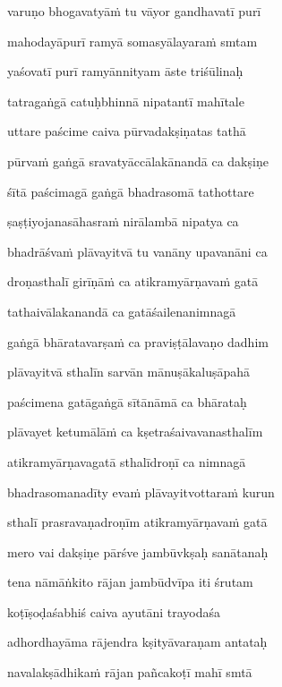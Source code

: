 varuṇo bhogavatyā\.m tu vāyor gandhavatī purī\thinspace{\dandab} \dontdisplaylinenum

mahodayāpurī ramyā somasyālayara\.m smtam \veg\dontdisplaylinenum

yaśovatī purī ramyānnityam āste triśūlinaḥ\thinspace{\dandab} \dontdisplaylinenum

tatragaṅgā catuḥbhinnā nipatantī mahītale \veg\dontdisplaylinenum

uttare paścime caiva pūrvadakṣiṇatas tathā\thinspace{\dandab} \dontdisplaylinenum

pūrva\.m gaṅgā sravatyāccālakānandā ca dakṣiṇe \veg\dontdisplaylinenum

śītā paścimagā gaṅgā bhadrasomā tathottare\thinspace{\dandab} \dontdisplaylinenum

ṣaṣṭiyojanasāhasra\.m nirālambā nipatya ca \veg\dontdisplaylinenum

bhadrāśva\.m plāvayitvā tu vanāny upavanāni ca\thinspace{\dandab} \dontdisplaylinenum

droṇasthalī girīṇā\.m ca atikramyārṇava\.m gatā \veg\dontdisplaylinenum

tathaivālakanandā ca gatāśailenanimnagā\thinspace{\dandab} \dontdisplaylinenum

gaṅgā bhāratavarṣa\.m ca praviṣṭālavaṇo dadhim \veg\dontdisplaylinenum

plāvayitvā sthalīn sarvān mānuṣākaluṣāpahā\thinspace{\dandab} \dontdisplaylinenum

paścimena gatāgaṅgā sītānāmā ca bhārataḥ \veg\dontdisplaylinenum

plāvayet ketumālā\.m ca kṣetraśaivavanasthalīm\thinspace{\dandab} \dontdisplaylinenum

atikramyārṇavagatā sthalīdroṇī ca nimnagā \veg\dontdisplaylinenum

bhadrasomanadīty eva\.m plāvayitvottara\.m kurun\thinspace{\dandab} \dontdisplaylinenum

sthalī prasravaṇadroṇīm atikramyārṇava\.m gatā \veg\dontdisplaylinenum

mero vai dakṣiṇe pārśve jambūvkṣaḥ sanātanaḥ\thinspace{\dandab} \dontdisplaylinenum

tena nāmāṅkito rājan jambūdvīpa iti śrutam \veg\dontdisplaylinenum

koṭīṣoḍaśabhiś caiva ayutāni trayodaśa\thinspace{\dandab} \dontdisplaylinenum

adhordhayāma rājendra kṣityāvaraṇam antataḥ \veg\dontdisplaylinenum

navalakṣādhika\.m rājan pañcakoṭī mahī smtā\thinspace{\dandab} \dontdisplaylinenum

